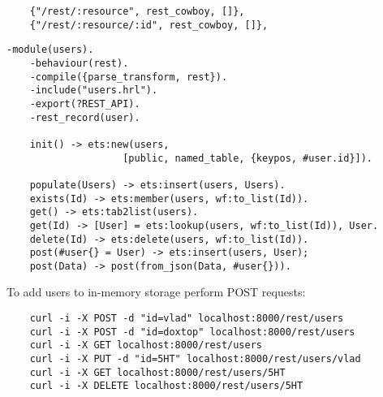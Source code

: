 \vspace{1\baselineskip}
\begin{lstlisting}
    {"/rest/:resource", rest_cowboy, []},
    {"/rest/:resource/:id", rest_cowboy, []},
\end{lstlisting}

\lstset{captionpos=b}
\vspace{1\baselineskip}
\begin{lstlisting}[caption=users.erl]
    -module(users).
    -behaviour(rest).
    -compile({parse_transform, rest}).
    -include("users.hrl").
    -export(?REST_API).
    -rest_record(user).

    init() -> ets:new(users,
                    [public, named_table, {keypos, #user.id}]).

    populate(Users) -> ets:insert(users, Users).
    exists(Id) -> ets:member(users, wf:to_list(Id)).
    get() -> ets:tab2list(users).
    get(Id) -> [User] = ets:lookup(users, wf:to_list(Id)), User.
    delete(Id) -> ets:delete(users, wf:to_list(Id)).
    post(#user{} = User) -> ets:insert(users, User);
    post(Data) -> post(from_json(Data, #user{})).
\end{lstlisting}
\vspace{1\baselineskip}

To add users to in-memory storage perform POST requests:

\vspace{1\baselineskip}
\begin{lstlisting}
    curl -i -X POST -d "id=vlad" localhost:8000/rest/users
    curl -i -X POST -d "id=doxtop" localhost:8000/rest/users
    curl -i -X GET localhost:8000/rest/users
    curl -i -X PUT -d "id=5HT" localhost:8000/rest/users/vlad
    curl -i -X GET localhost:8000/rest/users/5HT
    curl -i -X DELETE localhost:8000/rest/users/5HT
\end{lstlisting}
\vspace{1\baselineskip}

